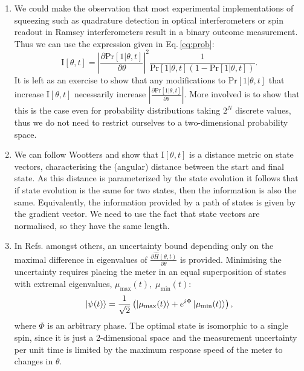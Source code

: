 \documentclass[reqno]{amsart}
\newcommand{\ket}[1]{\left| #1 \right>}
\newcommand{\hham}{\hat{H}}
\newcommand{\iu}{{i\mkern1mu}}
\def\func#1#2{\mathrm{#1}\left[#2\right]}
\begin{document}
\begin{enumerate}
\item We could make the observation that most experimental implementations of squeezing such as quadrature detection in optical interferometers or spin readout in Ramsey interferometers result in a binary outcome measurement. Thus we can use the expression given in Eq.\,\eqref{eq:prob}:
\[\func{I}{\theta,t} = \left|\frac{\partial \func{Pr}{1|\theta,t}}{\partial \theta}\right|^{2}\frac{1}{\func{Pr}{1|\theta,t}\left(1-\func{Pr}{1|\theta,t}\right)}.\]
It is left as an exercise to show that any modifications to $\func{Pr}{1|\theta,t}$ that increase $\func{I}{\theta,t}$ necessarily increase $\left|\frac{\partial \func{Pr}{1|\theta,t}}{\partial \theta}\right|$. More involved is to show that this is the case even for probability distributions taking $2^N$ discrete values, thus we do not need to restrict ourselves to a two-dimensional probability space.

\item We can follow Wootters \cite{Wootters1981} and show that $\func{I}{\theta,t}$ is a distance metric on state vectors, characterising the (angular) distance between the start and final state. As this distance is parameterized by the state evolution it follows that if state evolution is the same for two states, then the information is also the same. Equivalently, the information provided by a path of states is given by the gradient vector. We need to use the fact that state vectors are normalised, so they have the same length.

\item In Refs. \cite{Wootters1981, Braunstein1994, Childs2000, Giovannetti2006, Jones2010, Pang2017} amongst others, an uncertainty bound depending only on the maximal difference in eigenvalues of $\frac{\partial \hham(\theta,t)}{\partial \theta}$ is provided. Minimising the uncertainty requires placing the meter in an equal superposition of states with extremal eigenvalues, $\mu_{\mathrm{max}}(t), \; \mu_{\mathrm{min}}(t)$:
\[
\ket{\psi(t)} = \frac{1}{\sqrt{2}}\left(\ket{\mu_{\mathrm{max}}(t)} + e^{\iu \Phi}\ket{\mu_{\mathrm{min}}(t)}\right),
\]
where $\Phi$ is an arbitrary phase. The optimal state is isomorphic to a single spin, since it is just a 2-dimensional space and the measurement uncertainty per unit time is limited by the maximum response speed of the meter to changes in $\theta$.


\end{enumerate}
\end{document}
